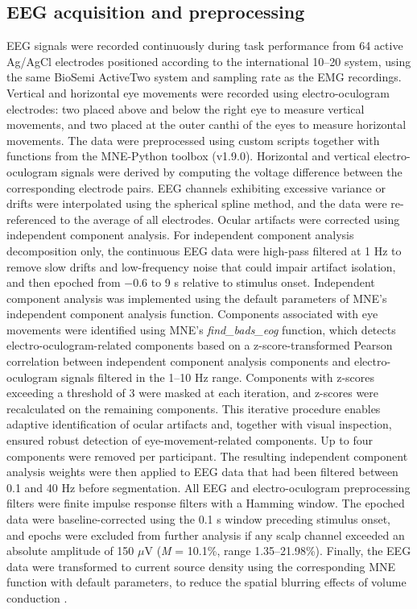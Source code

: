 \documentclass[a4paper,11pt]{article}
\theoremstyle{definition}
\newcommand{\1}{\mathbbm{1}}
\begin{document}
\subsection{EEG acquisition and preprocessing}

EEG signals were recorded continuously during task performance from 64 active Ag/AgCl electrodes positioned according to the international 10--20 system, using the same BioSemi ActiveTwo system and sampling rate as the EMG recordings. Vertical and horizontal eye movements were recorded using electro-oculogram electrodes: two placed above and below the right eye to measure vertical movements, and two placed at the outer canthi of the eyes to measure horizontal movements. The data were preprocessed using custom scripts together with functions from the MNE-Python toolbox (v1.9.0). Horizontal and vertical electro-oculogram signals were derived by computing the voltage difference between the corresponding electrode pairs. EEG channels exhibiting excessive variance or drifts were interpolated using the spherical spline method, and the data were re-referenced to the average of all electrodes. Ocular artifacts were corrected using independent component analysis. For independent component analysis decomposition only, the continuous EEG data were high-pass filtered at 1 Hz to remove slow drifts and low-frequency noise that could impair artifact isolation, and then epoched from $-$0.6 to 9 s relative to stimulus onset. Independent component analysis was implemented using the default parameters of MNE's independent component analysis function. Components associated with eye movements were identified using MNE's \emph{find\_bads\_eog} function, which detects electro-oculogram-related components based on a z-score-transformed Pearson correlation between independent component analysis components and electro-oculogram signals filtered in the 1--10 Hz range. Components with z-scores exceeding a threshold of 3 were masked at each iteration, and z-scores were recalculated on the remaining components. This iterative procedure enables adaptive identification of ocular artifacts and, together with visual inspection, ensured robust detection of eye-movement-related components. Up to four components were removed per participant. The resulting independent component analysis weights were then applied to EEG data that had been filtered between 0.1 and 40 Hz before segmentation. All EEG and electro-oculogram preprocessing filters were finite impulse response filters with a Hamming window. The epoched data were baseline-corrected using the 0.1 s window preceding stimulus onset, and epochs were excluded from further analysis if any scalp channel exceeded an absolute amplitude of 150 $\mu$V (\emph{M} = 10.1\%, range 1.35--21.98\%). Finally, the EEG data were transformed to current source density using the corresponding MNE function with default parameters, to reduce the spatial blurring effects of volume conduction \parencites[e.g.,][]{kellyNeurocomputationalMechanismsPriorinformed2021}{kellyInternalExternalInfluences2013}{twomeyAbstractEffectorSelectiveDecision2016}.
\end{document}
